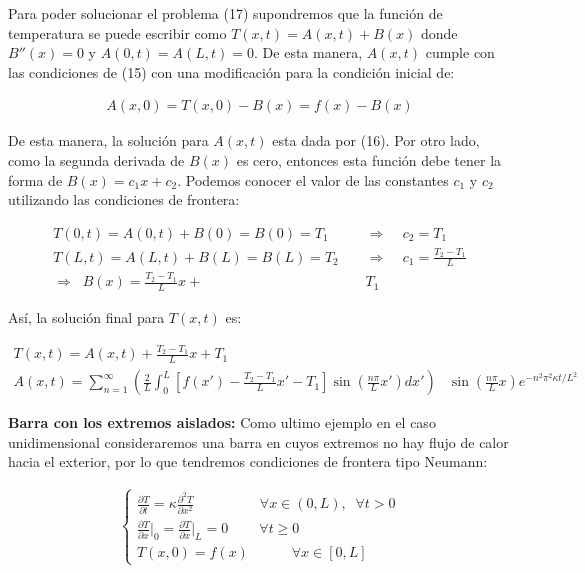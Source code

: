 \documentclass[12pt]{article}
\begin{document}
Para poder solucionar el problema (17) supondremos que la función de temperatura se puede escribir como $T(x,t) = A(x,t)+B(x)$ donde $B''(x) = 0$ y $A(0,t) = A(L,t) = 0$. De esta manera, $A(x,t)$ cumple con las condiciones de (15) con una modificación para la condición inicial de:

\begin{align*}
    A(x,0) = T(x,0)-B(x) = f(x) - B(x)
\end{align*}

De esta manera, la solución para $A(x,t)$ esta dada por (16). Por otro lado, como la segunda derivada de $B(x)$ es cero, entonces esta función debe tener la forma de $B(x) = c_1x + c_2$. Podemos conocer el valor de las constantes $c_1$ y $c_2$ utilizando las condiciones de frontera:

\begin{align*}
    T(0,t) = A(0,t)+B(0) = B(0) = T_1 \;\;\;\; &\Rightarrow \;\;\;\; c_2 = T_1 \\
    T(L,t) = A(L,t)+B(L) = B(L) = T_2 \;\;\;\; &\Rightarrow \;\;\;\; c_1 = \frac{T_2-T_1}{L} \\
    \Rightarrow \;\; B(x) = \frac{T_2-T_1}{L}x + &T_1
\end{align*}

Así, la solución final para $T(x,t)$ es:

\begin{align}
    T(x,t) = A(x,t) + \frac{T_2-T_1}{L}x + T_1 \;\;\;\;\;\;\;& \\
    \nonumber A(x,t) = \sum_{n=1}^{\infty} \left(\frac{2}{L}\int_0^L \left[f(x')-\frac{T_2-T_1}{L}x' -T_1\right]\sin \left(\frac{n\pi}{L}x'\right)dx'\right)&\sin\left(\frac{n\pi}{L}x\right) e^{-n^2\pi^2\kappa t/L^2}
\end{align}

\textbf{Barra con los extremos aislados: }Como ultimo ejemplo en el caso unidimensional consideraremos una barra en cuyos extremos no hay flujo de calor hacia el exterior, por lo que tendremos condiciones de frontera tipo Neumann:

\begin{align}
    \begin{cases}
        \frac{\partial T}{\partial t} = \kappa \frac{\partial^2 T}{\partial x^2} \;\;\;\;\;\;\;\;\;\;\;\;\;\;\;\;\; \forall x\in (0,L), \;\; \forall t>0 \\
        \frac{\partial T}{\partial x} \Big|_0 = \frac{\partial T}{\partial x}\Big|_L = 0 \;\;\;\;\;\;\;\; \forall t \geq 0 \\
        T(x,0) = f(x) \;\;\;\;\;\;\;\;\;\;\; \forall x\in [0,L]
    \end{cases}
\end{align}
\end{document}

